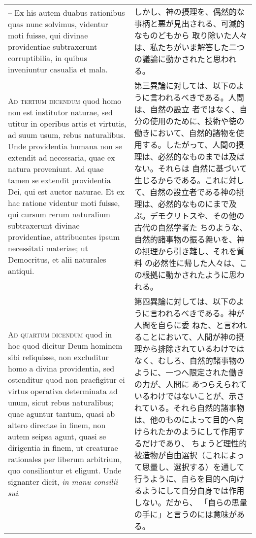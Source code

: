 \documentclass[10pt]{jsarticle} %
\begin{document}
\begin{longtable}{p{21em}p{21em}}
\\

-- Ex his autem duabus rationibus
quas nunc solvimus, videntur moti fuisse, qui divinae providentiae
subtraxerunt corruptibilia, in quibus inveniuntur casualia et mala.

&

しかし、神の摂理を、偶然的な事柄と悪が見出される、可滅的なものどもから
取り除いた人々は、私たちがいま解答した二つの議論に動かされたと思われる。


\\



{\scshape Ad tertium dicendum} quod homo non est
institutor naturae, sed utitur in operibus artis et virtutis, ad suum
usum, rebus naturalibus. Unde providentia humana non se extendit ad
necessaria, quae ex natura proveniunt. Ad quae tamen se extendit
providentia Dei, qui est auctor naturae. Et ex hac ratione videntur moti
fuisse, qui cursum rerum naturalium subtraxerunt divinae providentiae,
attribuentes ipsum necessitati materiae; ut Democritus, et alii
naturales antiqui.

&


第三異論に対しては、以下のように言われるべきである。人間は、自然の設立
者ではなく、自分の使用のために、技術や徳の働きにおいて、自然的諸物を使
用する。したがって、人間の摂理は、必然的なものまでは及ばない。それらは
自然に基づいて生じるからである。これに対して、自然の設立者である神の摂
理は、必然的なものにまで及ぶ。デモクリトスや、その他の古代の自然学者た
ちのような、自然的諸事物の振る舞いを、神の摂理から引き離し、それを質料
の必然性に帰した人々は、この根拠に動かされたように思われる。

\\


{\scshape Ad quartum dicendum} quod in hoc quod dicitur
Deum hominem sibi reliquisse, non excluditur homo a divina providentia,
sed ostenditur quod non praefigitur ei virtus operativa determinata ad
unum, sicut rebus naturalibus; quae aguntur tantum, quasi ab altero
directae in finem, non autem seipsa agunt, quasi se dirigentia in finem,
ut creaturae rationales per liberum arbitrium, quo consiliantur et
eligunt. Unde signanter dicit, {\itshape in manu consilii sui}. 

&

第四異論に対しては、以下のように言われるべきである。神が人間を自らに委
ねた、と言われることにおいて、人間が神の摂理から排除されているわけでは
なく、むしろ、自然的諸事物のように、一つへ限定された働きの力が、人間に
あつらえられているわけではないことが、示されている。それら自然的諸事物
は、他のものによって目的へ向けられたかのようにして作用するだけであり、
ちょうど理性的被造物が自由選択（これによって思量し、選択する）を通して
行うように、自らを目的へ向けるようにして自分自身では作用しない。だから、
「自らの思量の手に」と言うのには意味がある。


\end{longtable}
\end{document}
